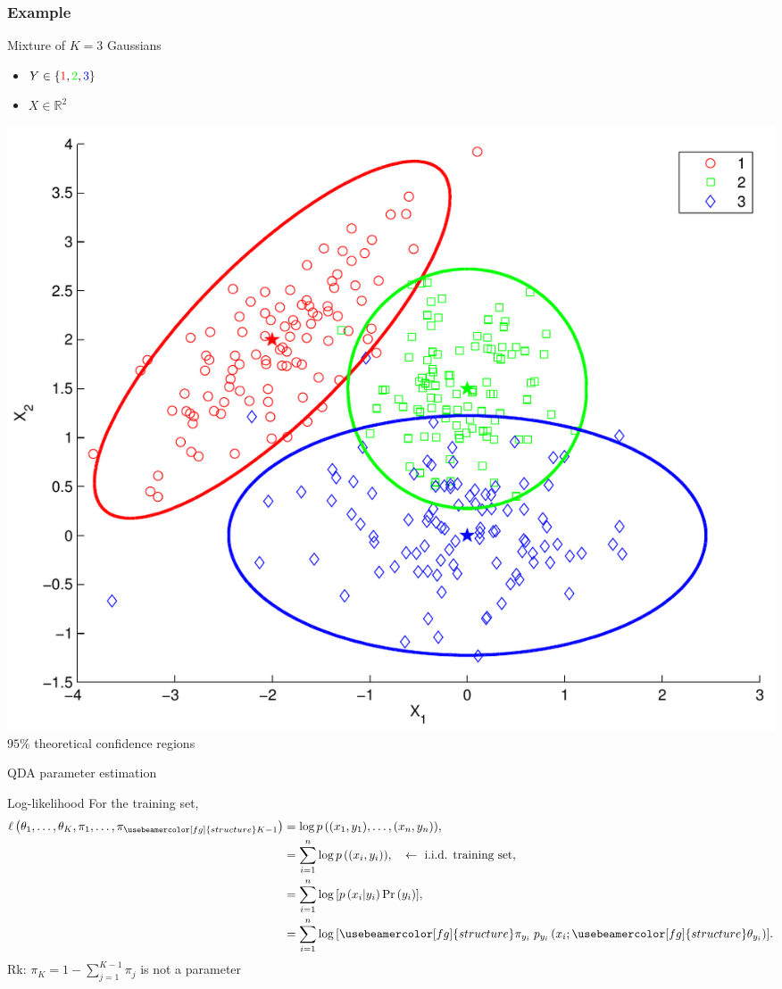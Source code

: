\documentclass[compress, smaller, serif, 9pt]{beamer}
\newcommand{\structuretext}[1]{{\usebeamercolor[fg]{structure} #1}}
\begin{document}
\begin{frame}
  \frametitle{Example}
\begin{block}{Mixture of $K=3$ Gaussians}
\begin{itemize}
   \item $Y \in \{\textcolor{red}{1},\textcolor{green}{2},\textcolor{blue}{3}\}$
   \item $X \in \mathbb{R}^2$
\end{itemize}
\end{block}
\vspace*{-8mm}

\begin{center}
  \includegraphics[width=.65\textwidth]{discr_analysis_CI.pdf} \\
  $95\%$ theoretical confidence regions
\end{center}

\end{frame}




\begin{frame}{QDA parameter estimation}

\begin{block}{Log-likelihood}
For the training set,
\begin{align*}
\ell\left(\theta_1, \ldots, \theta_K, \pi_1, \ldots, \pi_{\structuretext{K-1}} \right) &=
\log{ p\left( (x_1,y_1), \ldots, (x_n,y_n) \right)  },  \\
&= \sum_{i=1}^n \log{  p\left( (x_i,y_i)  \right)  },\quad \leftarrow  \textrm{ i.i.d. training set}, \\
&= \sum_{i=1}^n \log{\left[ p\left( x_i | y_i\right)  \Pr{(y_i)} \right]   },\\
&= \sum_{i=1}^n \log{\left[  \structuretext{\pi_{y_i}} \; p_{y_i}\left( x_i ;  \structuretext{\theta_{y_i}}  \right)\right] }.
\end{align*}
Rk: $\pi_{K}=1- \sum_{j=1}^{K-1} \pi_j$ is not a parameter
\end{block}

\end{frame}
\end{document}
